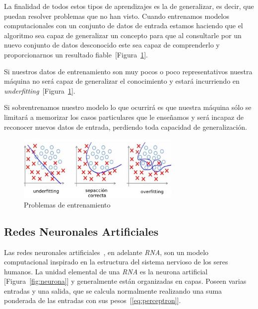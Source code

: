 
La finalidad de todos estos tipos de aprendizajes es la de generalizar, es decir, que puedan resolver problemas que no han visto. 
Cuando entrenamos modelos computacionales con un conjunto de datos de entrada estamos haciendo que el algoritmo sea capaz de generalizar un concepto para que al consultarle por un nuevo conjunto de datos desconocido este sea capaz de comprenderlo y proporcionarnos un resultado fiable~[Figura~\ref{fig:over-under-fitting}].

Si nuestros datos de entrenamiento son muy pocos o poco representativos nuestra máquina no será capaz de generalizar el conocimiento y estará incurriendo en \textit{underfitting}~[Figura~\ref{fig:over-under-fitting}].

Si sobrentrenamos nuestro modelo lo que ocurrirá es que nuestra máquina sólo se limitará a memorizar los casos particulares que le enseñamos y será incapaz de reconocer nuevos datos de entrada, perdiendo toda capacidad de generalización.



\begin{figure}[h]
    \centering
    \includegraphics[width=0.7\textwidth, keepaspectratio]{imaxes/overfitting.png}
    \caption{Problemas de entrenamiento}
    \label{fig:over-under-fitting}
\end{figure}




\subsection{Redes Neuronales Artificiales}
Las redes neuronales artificiales~\cite{salas2004redes}, en adelante \textit{RNA}, son un modelo computacional inspirado en la estructura del sistema nervioso de los seres humanos. La unidad elemental de una \textit{RNA} es la neurona artificial [Figura~\ref{fig:neurona}] y generalmente están organizadas en capas. Poseen varias entradas y una salida, que se calcula normalmente realizando una suma ponderada de las entradas con sus pesos~[\ref{eq:perceptron}]. 

